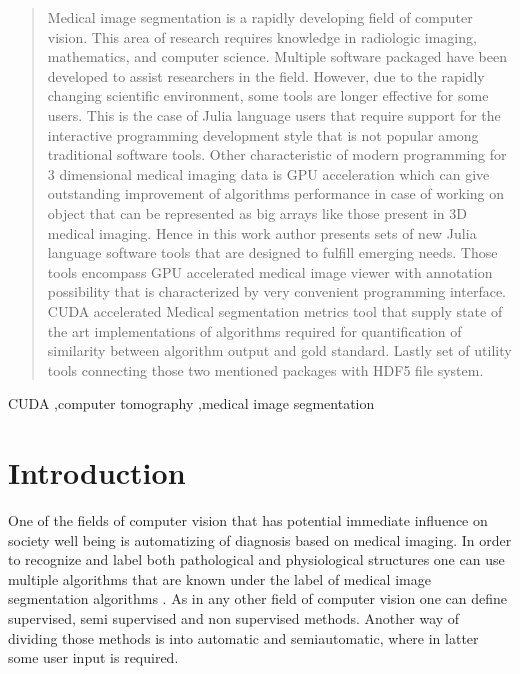 \documentclass[preprint,12pt]{elsarticle}
\begin{document}
\begin{frontmatter}
\begin{abstract}
Medical image segmentation is a rapidly developing field of computer vision. This area of research requires knowledge in radiologic imaging, mathematics, and computer science. Multiple software packaged have been developed to  assist researchers in the field. However, due to the rapidly changing scientific environment, some tools are longer  effective for some users. This is the case of Julia language users that require support for the interactive programming development style that is not popular among traditional software tools. Other characteristic of modern programming for 3 dimensional medical imaging data is GPU acceleration which can give outstanding improvement of algorithms performance in case of working on object that can be represented as big arrays like those present in 3D medical imaging. Hence in this work author presents sets of new Julia language software tools that are designed to fulfill emerging needs. Those tools encompass GPU accelerated medical image viewer with annotation possibility that is characterized by very convenient programming interface. CUDA accelerated Medical segmentation metrics tool that supply state of the art implementations of algorithms required for quantification of similarity between algorithm output and gold standard. Lastly set of utility tools connecting those two mentioned packages with HDF5 file system.
\end{abstract}

\begin{keyword}
CUDA \sep computer tomography \sep medical image segmentation

\end{keyword}

\end{frontmatter}



\section{Introduction}
One of the fields of computer vision that has potential immediate influence on society well being is automatizing of diagnosis based on medical imaging. In order to recognize and label both pathological and physiological structures one can use multiple algorithms that are known under the label of medical image segmentation algorithms . As in any other field of computer vision one can define supervised, semi supervised and non supervised methods. Another way of dividing those methods is into automatic and semiautomatic, where in latter some  user input is required.
\end{document}
